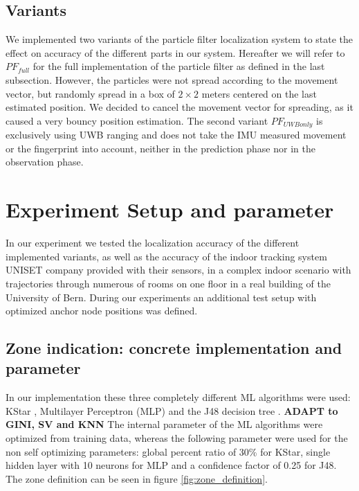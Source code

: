 \subsection{Variants}
We implemented two variants of the particle filter localization system to state the effect on accuracy of the different parts in our system.
Hereafter we will refer to $PF_{full}$ for the full implementation of the particle filter as defined in the last subsection. However, the particles were not spread according to the movement vector, but randomly spread in a box of $2 \times 2$ meters centered on the last estimated position. We decided to cancel the movement vector for spreading, as it caused a very bouncy position estimation.
The second variant $PF_{UWBonly}$ is exclusively using UWB ranging and does not take the IMU measured movement or the fingerprint into account, neither in the prediction phase nor in the observation phase. 



\section{Experiment Setup and parameter}
In our experiment we tested the localization accuracy of the different implemented variants, as well as the accuracy of the indoor tracking system UNISET company provided with their sensors, in a complex indoor scenario with trajectories through numerous of rooms on one floor in a real building of the University of Bern. During our experiments an additional test setup with optimized anchor node positions was defined.

\subsection{Zone indication: concrete implementation and parameter}
In our implementation these three completely different ML algorithms were used: KStar \cite{KStar}, Multilayer Perceptron (MLP) \cite{MLP} and the J48 decision tree \cite{J48}.  \textbf{ADAPT to GINI, SV and KNN}
The internal parameter of the ML algorithms were optimized from training data, whereas the following parameter were used for the non self optimizing parameters: global percent ratio of 30\% for KStar, single hidden layer with 10 neurons for MLP and a confidence factor of 0.25 for J48.
The zone definition can be seen in figure \ref{fig:zone_definition}.

